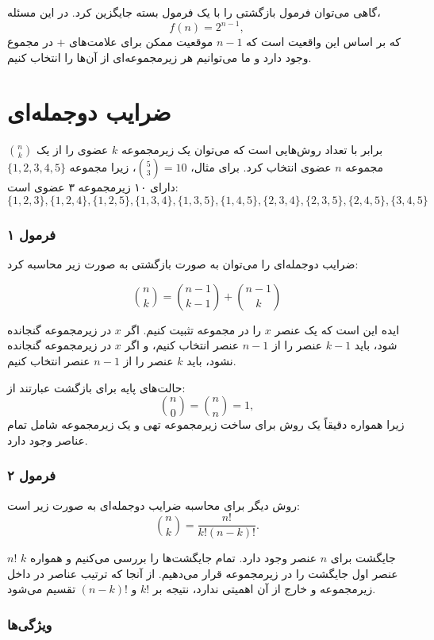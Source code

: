گاهی می‌توان فرمول بازگشتی را با یک فرمول بسته جایگزین کرد.
در این مسئله،
\[
f(n)=2^{n-1},
\]
که بر اساس این واقعیت است که $n-1$ موقعیت ممکن برای علامت‌های + در مجموع وجود دارد
و ما می‌توانیم هر زیرمجموعه‌ای از آن‌ها را انتخاب کنیم.

\section{ضرایب دوجمله‌ای}


 ${n \choose k}$ برابر با تعداد روش‌هایی است
که می‌توان یک زیرمجموعه $k$ عضوی را از یک مجموعه $n$ عضوی انتخاب کرد.
برای مثال، ${5 \choose 3}=10$،
زیرا مجموعه $\{1,2,3,4,5\}$
دارای ۱۰ زیرمجموعه ۳ عضوی است:
\[ \{1,2,3\}, \{1,2,4\}, \{1,2,5\}, \{1,3,4\}, \{1,3,5\}, 
\{1,4,5\}, \{2,3,4\}, \{2,3,5\}, \{2,4,5\}, \{3,4,5\} \]

\subsubsection{فرمول ۱}

ضرایب دوجمله‌ای را می‌توان به صورت بازگشتی به صورت زیر محاسبه کرد:

\[
{n \choose k}  =  {n-1 \choose k-1} + {n-1 \choose k}
\]

ایده این است که یک عنصر $x$ را در مجموعه تثبیت کنیم.
اگر $x$ در زیرمجموعه گنجانده شود،
باید $k-1$ عنصر را از $n-1$ عنصر انتخاب کنیم،
و اگر $x$ در زیرمجموعه گنجانده نشود،
باید $k$ عنصر را از $n-1$ عنصر انتخاب کنیم.

حالت‌های پایه برای بازگشت عبارتند از:
\[
{n \choose 0}  =  {n \choose n} = 1,
\]
زیرا همواره دقیقاً یک روش برای ساخت زیرمجموعه تهی
و یک زیرمجموعه شامل تمام عناصر وجود دارد.

\subsubsection{فرمول ۲}

روش دیگر برای محاسبه ضرایب دوجمله‌ای به صورت زیر است:
\[
{n \choose k}  =  \frac{n!}{k!(n-k)!}.
\]

$n!$ جایگشت برای $n$ عنصر وجود دارد.
تمام جایگشت‌ها را بررسی می‌کنیم و همواره
$k$ عنصر اول جایگشت را در زیرمجموعه قرار می‌دهیم.
از آنجا که ترتیب عناصر در داخل زیرمجموعه
و خارج از آن اهمیتی ندارد،
نتیجه بر $k!$ و $(n-k)!$ تقسیم می‌شود.

\subsubsection{ویژگی‌ها}

